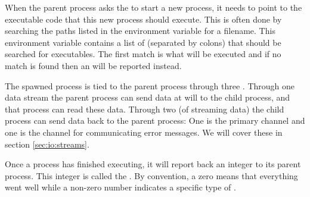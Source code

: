 When the parent process asks the  to start a new process, it needs to point to the executable code that this new process should execute. This is often done by searching the paths listed in the  environment variable for a filename. This environment variable contains a list of  (separated by colons) that should be searched for executables. The first match is what will be executed and if no match is found then an  will be reported instead.

The spawned process is tied to the parent process through three . Through one data stream the parent process can send data at will to the child process, and that process can read these data. Through two  (of streaming data) the child process can send data back to the parent process: One is the primary channel and one is the channel for communicating error messages. We will cover these in section \ref{sec:io:streams}.

Once a process has finished executing, it will report back an integer to its parent process. This integer is called the . By convention, a zero means that everything went well while a non-zero number indicates a specific type of .

